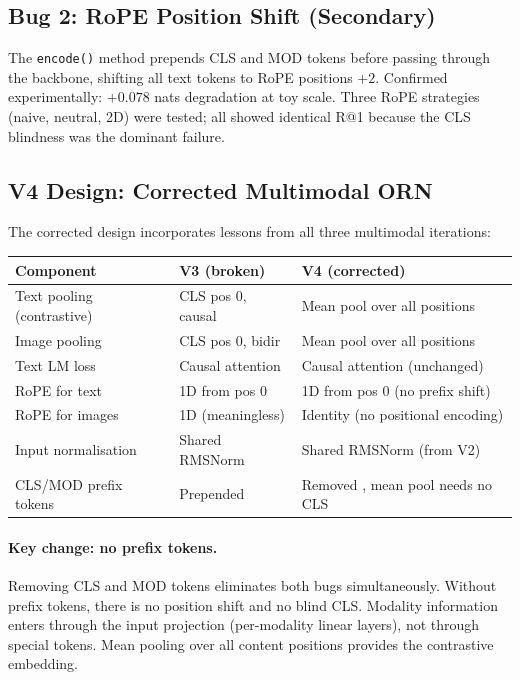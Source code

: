 \documentclass[11pt, a4paper]{article}
\theoremstyle{plain}
\theoremstyle{remark}
\begin{document}
\subsection{Bug 2: RoPE Position Shift (Secondary)}

The \texttt{encode()} method prepends CLS and MOD tokens before passing through the backbone, shifting all text tokens to RoPE positions $+2$.
Confirmed experimentally: $+0.078$ nats degradation at toy scale.
Three RoPE strategies (naive, neutral, 2D) were tested; all showed identical R@1 because the CLS blindness was the dominant failure.

\subsection{V4 Design: Corrected Multimodal ORN}
\label{sec:v4-design}

The corrected design incorporates lessons from all three multimodal iterations:

\begin{center}\small
\begin{tabular}{lll}
\toprule
\textbf{Component} & \textbf{V3 (broken)} & \textbf{V4 (corrected)} \\
\midrule
Text pooling (contrastive) & CLS pos 0, causal & Mean pool over all positions \\
Image pooling              & CLS pos 0, bidir  & Mean pool over all positions \\
Text LM loss               & Causal attention   & Causal attention (unchanged) \\
RoPE for text              & 1D from pos 0      & 1D from pos 0 (no prefix shift) \\
RoPE for images            & 1D (meaningless)    & Identity (no positional encoding) \\
Input normalisation        & Shared RMSNorm      & Shared RMSNorm (from V2) \\
CLS/MOD prefix tokens      & Prepended           & Removed ,  mean pool needs no CLS \\
\bottomrule
\end{tabular}
\end{center}

\paragraph{Key change: no prefix tokens.}
Removing CLS and MOD tokens eliminates both bugs simultaneously.
Without prefix tokens, there is no position shift and no blind CLS.
Modality information enters through the input projection (per-modality linear layers), not through special tokens.
Mean pooling over all content positions provides the contrastive embedding.
\end{document}
